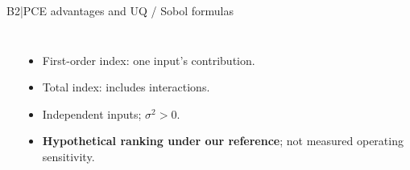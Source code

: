 \begin{frame}[more-space,label=backup-B2]{B2\enspace|\enspace PCE advantages and UQ / Sobol formulas}
\begin{columns}[T,onlytextwidth]
{\begin{minipage}[t][40mm][t]{\dimexpr\linewidth-2\fboxsep-2\fboxrule\relax}
\[          \]
          \begin{itemize}
            \setlength{\itemsep}{1pt}
            \item First-order index: one input's contribution.
            \item Total index: includes interactions.
            \item Independent inputs; $\sigma^2>0$.
            \item \textbf{Hypothetical ranking under our reference}; not measured operating sensitivity.
          \end{itemize}
        \end{minipage}%
      }
  \end{columns}
  \medskip
\end{frame}

\renewcommand{\backupcode}{B3}

